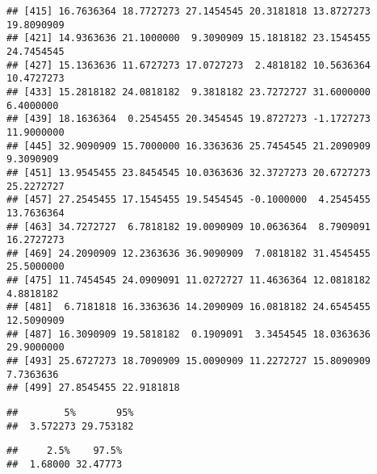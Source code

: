 \documentclass[]{book}
\newenvironment{Shaded}{\begin{snugshade}}{\end{snugshade}}
\newcommand{\CommentTok}[1]{\textcolor[rgb]{0.56,0.35,0.01}{\textit{#1}}}
\newcommand{\FloatTok}[1]{\textcolor[rgb]{0.00,0.00,0.81}{#1}}
\newcommand{\KeywordTok}[1]{\textcolor[rgb]{0.13,0.29,0.53}{\textbf{#1}}}
\newcommand{\NormalTok}[1]{#1}
\begin{document}
\begin{verbatim}
## [415] 16.7636364 18.7727273 27.1454545 20.3181818 13.8727273 19.8090909
## [421] 14.9363636 21.1000000  9.3090909 15.1818182 23.1545455 24.7454545
## [427] 15.1363636 11.6727273 17.0727273  2.4818182 10.5636364 10.4727273
## [433] 15.2818182 24.0818182  9.3818182 23.7272727 31.6000000  6.4000000
## [439] 18.1636364  0.2545455 20.3454545 19.8727273 -1.1727273 11.9000000
## [445] 32.9090909 15.7000000 16.3363636 25.7454545 21.2090909  9.3090909
## [451] 13.9545455 23.8454545 10.0363636 32.3727273 20.6727273 25.2272727
## [457] 27.2545455 17.1545455 19.5454545 -0.1000000  4.2545455 13.7636364
## [463] 34.7272727  6.7818182 19.0090909 10.0636364  8.7909091 16.2727273
## [469] 24.2090909 12.2363636 36.9090909  7.0818182 31.4545455 25.5000000
## [475] 11.7454545 24.0909091 11.0272727 11.4636364 12.0818182  4.8818182
## [481]  6.7181818 16.3363636 14.2090909 16.0818182 24.6545455 12.5090909
## [487] 16.3090909 19.5818182  0.1909091  3.3454545 18.0363636 29.9000000
## [493] 25.6727273 18.7090909 15.0090909 11.2272727 15.8090909  7.7363636
## [499] 27.8545455 22.9181818
\end{verbatim}

\begin{Shaded}
\end{Shaded}

\begin{verbatim}
##        5%       95% 
##  3.572273 29.753182
\end{verbatim}

\begin{Shaded}
\end{Shaded}

\begin{verbatim}
##     2.5%    97.5% 
##  1.68000 32.47773
\end{verbatim}

\begin{Shaded}
\end{Shaded}
\end{document}
